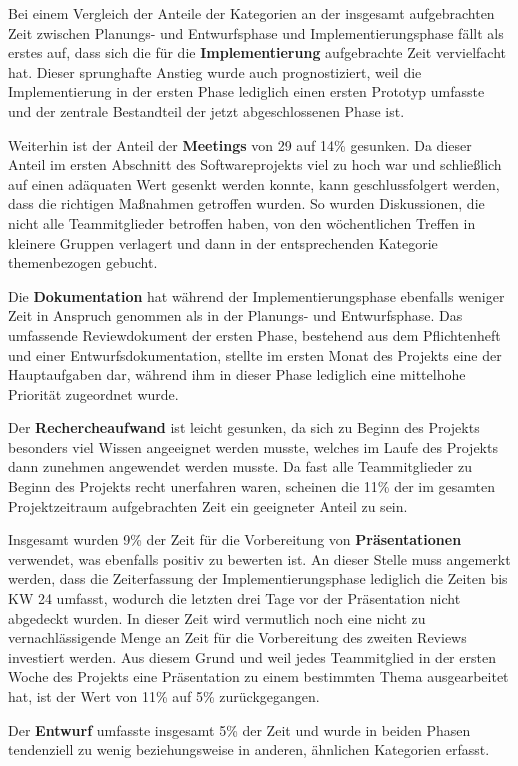 \documentclass[../review_2.tex]{subfiles}
\begin{document}
Bei einem Vergleich der Anteile der Kategorien an der insgesamt aufgebrachten Zeit zwischen Planungs- und Entwurfsphase und Implementierungsphase fällt als erstes auf, dass sich die für die \textbf{Implementierung} aufgebrachte Zeit vervielfacht hat. Dieser sprunghafte Anstieg wurde auch prognostiziert, weil die Implementierung in der ersten Phase lediglich einen ersten Prototyp umfasste und der zentrale Bestandteil der jetzt abgeschlossenen Phase ist.

Weiterhin ist der Anteil der \textbf{Meetings} von 29 auf 14\% gesunken. Da dieser Anteil im ersten Abschnitt des Softwareprojekts viel zu hoch war und schließlich auf einen adäquaten Wert gesenkt werden konnte, kann geschlussfolgert werden, dass die richtigen Maßnahmen getroffen wurden. So wurden Diskussionen, die nicht alle Teammitglieder betroffen haben, von den wöchentlichen Treffen in kleinere Gruppen verlagert und dann in der entsprechenden Kategorie themenbezogen gebucht.

Die \textbf{Dokumentation} hat während der Implementierungsphase ebenfalls weniger Zeit in Anspruch genommen als in der Planungs- und Entwurfsphase. Das umfassende Reviewdokument der ersten Phase, bestehend aus dem Pflichtenheft und einer Entwurfsdokumentation, stellte im ersten Monat des Projekts eine der Hauptaufgaben dar, während ihm in dieser Phase lediglich eine mittelhohe Priorität zugeordnet wurde.

Der \textbf{Rechercheaufwand} ist leicht gesunken, da sich zu Beginn des Projekts besonders viel Wissen angeeignet werden musste, welches im Laufe des Projekts dann zunehmen angewendet werden musste. Da fast alle Teammitglieder zu Beginn des Projekts recht unerfahren waren, scheinen die 11\% der im gesamten Projektzeitraum aufgebrachten Zeit ein geeigneter Anteil zu sein.

Insgesamt wurden 9\% der Zeit für die Vorbereitung von \textbf{Präsentationen} verwendet, was ebenfalls positiv zu bewerten ist. An dieser Stelle muss angemerkt werden, dass die Zeiterfassung der Implementierungsphase lediglich die Zeiten bis KW 24 umfasst, wodurch die letzten drei Tage vor der Präsentation nicht abgedeckt wurden. In dieser Zeit wird vermutlich noch eine nicht zu vernachlässigende Menge an Zeit für die Vorbereitung des zweiten Reviews investiert werden. Aus diesem Grund und weil jedes Teammitglied in der ersten Woche des Projekts eine Präsentation zu einem bestimmten Thema ausgearbeitet hat, ist der Wert von 11\% auf 5\% zurückgegangen.

Der \textbf{Entwurf} umfasste insgesamt 5\% der Zeit und wurde in beiden Phasen tendenziell zu wenig beziehungsweise in anderen, ähnlichen Kategorien erfasst.
\end{document}
